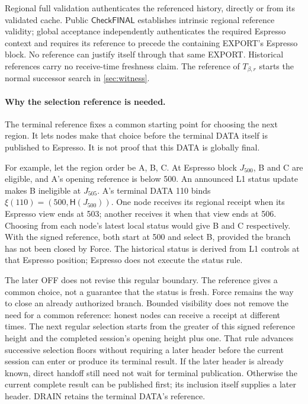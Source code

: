 \documentclass[11pt,a4paper]{article}
\newcommand{\Hash}{\mathsf H}
\newcommand{\tagg}[1]{\ensuremath{\mathsf{#1}}}
\begin{document}
Regional full validation authenticates the referenced history, directly
or from its validated cache. Public \tagg{CheckFINAL} establishes intrinsic
regional reference validity; global acceptance independently authenticates
the required Espresso context and requires its reference to precede the
containing EXPORT's Espresso block. No reference can
justify itself through that same EXPORT. Historical references carry no
receive-time freshness claim. The reference of $T_{\beta,r}$ starts the normal
successor search in \cref{sec:witness}.

\paragraph{Why the selection reference is needed.}
The terminal reference fixes a common starting point for choosing the next
region. It lets nodes make that choice before the terminal DATA itself is
published to Espresso. It is not proof that this DATA is globally final.

For example, let the region order be A, B, C. At Espresso block $J_{500}$,
B and C are eligible, and A's opening reference is below 500. An announced
L1 status update makes B ineligible at
$J_{505}$. A's terminal DATA 110 binds $\xi(110)=(500,\Hash(J_{500}))$.
One node receives its regional receipt when its Espresso view ends at 503;
another receives it when that view ends at 506. Choosing from each node's
latest local status would give B and C respectively. With the signed
reference, both start at 500 and select B, provided the branch has not
been closed by Force. The historical status is derived from L1 controls
at that Espresso position; Espresso does not execute the status rule.

The later OFF does not revise this regular boundary. The reference gives
a common choice, not a guarantee that the status is fresh. Force remains
the way to close an already authorized branch. Bounded visibility does
not remove the need for a common reference: honest nodes can receive a
receipt at different times. The next regular selection starts from
the greater of this signed reference height and the completed session's
opening height plus one. That rule advances successive selection floors
without requiring a later header before the current session can enter
or produce its terminal result. If the later header is already known,
direct handoff still need not wait for terminal publication. Otherwise
the current complete result can be published first; its inclusion itself
supplies a later header. DRAIN retains the terminal DATA's reference.
\end{document}

